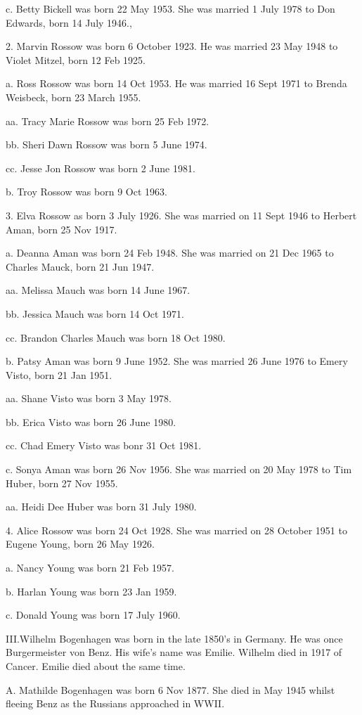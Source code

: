 \documentclass[a4paper]{article}
\begin{document}
c. Betty Bickell was born 22 May 1953.  She was married 1 July 1978 to Don Edwards, born 14 July 1946.,
 
2. Marvin Rossow was born 6 October 1923.  He was married 23 May 1948 to Violet Mitzel, born 12 Feb 1925.
 
a. Ross Rossow was born 14 Oct 1953.  He was married 16 Sept 1971 to Brenda Weisbeck, born 23 March 1955.
 
aa. Tracy Marie Rossow was born 25 Feb 1972.
 
bb. Sheri Dawn Rossow was born 5 June 1974.

cc. Jesse Jon Rossow was born 2 June 1981.

b. Troy Rossow was born 9 Oct 1963.

3. Elva Rossow as born 3 July 1926.  She was married on 11 Sept 1946 to Herbert Aman, born 25 Nov 1917.
 
a. Deanna Aman was born 24 Feb 1948.  She was married on 21 Dec 1965 to Charles Mauck, born 21 Jun 1947.  
 
aa. Melissa Mauch was born 14 June 1967.

bb. Jessica Mauch was born 14 Oct 1971.

cc. Brandon Charles Mauch was born 18 Oct 1980.

b. Patsy Aman was born 9 June 1952.  She was married 26 June 1976 to Emery Visto, born 21 Jan 1951.
 
aa. Shane Visto was born 3 May 1978.

bb. Erica Visto was born 26 June 1980.

cc. Chad Emery Visto was bonr 31 Oct 1981.

c. Sonya Aman was born 26 Nov 1956.  She was married on 20 May 1978 to Tim Huber, born 27 Nov 1955.
 
aa. Heidi Dee Huber was born 31 July 1980.

4. Alice Rossow was born 24 Oct 1928.  She was married on 28 October 1951 to Eugene Young, born 26 May 1926.
		 
a. Nancy Young was born 21 Feb 1957.

b. Harlan Young was born 23 Jan 1959.

c. Donald Young was born 17 July 1960.

III.Wilhelm Bogenhagen was born in the late 1850's in Germany.  He was once Burgermeister von Benz.  His wife's name was Emilie.  Wilhelm died in 1917 of Cancer.  Emilie died about the same time.

A. Mathilde Bogenhagen was born 6 Nov 1877.  She died in May 1945 whilst fleeing Benz as the Russians approached in WWII.
 
\end{document}
